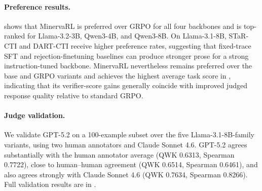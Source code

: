\paragraph{Preference results.}
 shows that MinervaRL is preferred over GRPO for all four backbones and is top-ranked for Llama-3.2-3B, Qwen3-4B, and Qwen3-8B. On Llama-3.1-8B, STaR-CTI and DART-CTI receive higher preference rates, suggesting that fixed-trace SFT and rejection-finetuning baselines can produce stronger prose for a strong instruction-tuned backbone. MinervaRL nevertheless remains preferred over the base and GRPO variants and achieves the highest average task score in , indicating that its verifier-score gains generally coincide with improved judged response quality relative to standard GRPO.

















\paragraph{Judge validation.}
We validate GPT-5.2 on a 100-example subset over the five Llama-3.1-8B-family variants, using two human annotators and Claude Sonnet 4.6. GPT-5.2 agrees substantially with the human annotator average (QWK 0.6313, Spearman 0.7722), close to human--human agreement (QWK 0.6514, Spearman 0.6461), and also agrees strongly with Claude Sonnet 4.6 (QWK 0.7634, Spearman 0.8266). Full validation results are in .

\begin{table}[t]
\centering
\begin{minipage}{0.80\textwidth}
\centering
\scriptsize
\caption{Average performance on training-aligned and not-in-training evaluation tasks.}
\label{tab:seen-vs-heldout}
\setlength{\tabcolsep}{2pt}
\renewcommand{\arraystretch}{0.88}
\end{minipage}
\end{table}

